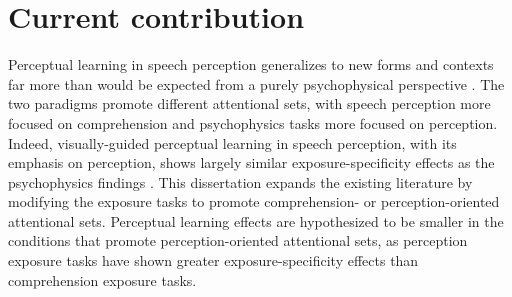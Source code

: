 \section{Current contribution}

Perceptual learning in speech perception generalizes to new forms and contexts far more than would be expected from a purely psychophysical perspective \citep{Norris2003,Gilbert2001}.
The two paradigms promote different attentional sets, with speech perception more focused on comprehension and psychophysics tasks more focused on perception.  
Indeed, visually-guided perceptual learning in speech perception, with its emphasis on perception, shows largely similar exposure-specificity effects as the psychophysics findings \citep{Reinisch2014}.
This dissertation expands the existing literature by modifying the exposure tasks to promote comprehension- or perception-oriented attentional sets.
Perceptual learning effects are hypothesized to be smaller in the conditions that promote perception-oriented attentional sets, as perception exposure tasks have shown greater exposure-specificity effects than comprehension exposure tasks.

